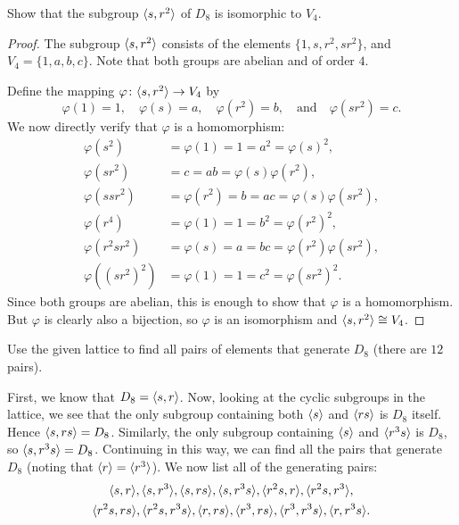  Show that the subgroup $\langle{s, r^2}\rangle$ of $D_8$ is
isomorphic to $V_4$.
\begin{proof}
  The subgroup $\langle{s, r^2}\rangle$ consists of the elements
  $\{1, s, r^2, sr^2\}$, and $V_4 = \{1, a, b, c\}$. Note that both
  groups are abelian and of order $4$.

  Define the mapping $\varphi\colon\langle{s,r^2}\rangle\to V_4$ by
  \begin{equation*}
    \varphi(1) = 1,
    \quad
    \varphi(s) = a,
    \quad
    \varphi(r^2) = b,
    \quad\text{and}\quad
    \varphi(sr^2) = c.
  \end{equation*}
  We now directly verify that $\varphi$ is a homomorphism:
  \begin{align*}
    \varphi(s^2) &= \varphi(1) = 1 = a^2 = \varphi(s)^2, \\
    \varphi(sr^2) &= c = ab = \varphi(s)\varphi(r^2), \\
    \varphi(ssr^2) &= \varphi(r^2) = b = ac = \varphi(s)\varphi(sr^2), \\
    \varphi(r^4) &= \varphi(1) = 1 = b^2 = \varphi(r^2)^2, \\
    \varphi(r^2sr^2) &= \varphi(s) = a = bc = \varphi(r^2)\varphi(sr^2), \\
    \varphi((sr^2)^2) &= \varphi(1) = 1 = c^2 = \varphi(sr^2)^2.
  \end{align*}
  Since both groups are abelian, this is enough to show that $\varphi$
  is a homomorphism. But $\varphi$ is clearly also a bijection, so
  $\varphi$ is an isomorphism and $\langle{s,r^2}\rangle\cong V_4$.
\end{proof}

 Use the given lattice to find all pairs of elements that
generate $D_8$ (there are $12$ pairs).
\begin{solution}
  First, we know that $D_8 = \langle{s,r}\rangle$. Now, looking at the cyclic
  subgroups in the lattice, we see that the only subgroup containing
  both $\langle{s}\rangle$ and $\langle{rs}\rangle$ is $D_8$ itself. Hence
  $\langle{s, rs}\rangle = D_8$. Similarly, the only subgroup containing
  $\langle{s}\rangle$ and $\langle{r^3s}\rangle$ is $D_8$, so $\langle{s, r^3s}\rangle =
  D_8$. Continuing in this way, we can find all the pairs that
  generate $D_8$ (noting that $\langle{r}\rangle = \langle{r^3}\rangle$). We now list all
  of the generating pairs:
  \begin{multline*}
    \langle{s,r}\rangle, \langle{s,r^3}\rangle, \langle{s,rs}\rangle, \langle{s,r^3s}\rangle,
    \langle{r^2s,r}\rangle, \langle{r^2s,r^3}\rangle, \\ \langle{r^2s,rs}\rangle, \langle{r^2s,r^3s}\rangle,
    \langle{r,rs}\rangle, \langle{r^3,rs}\rangle, \langle{r^3,r^3s}\rangle, \langle{r,r^3s}\rangle.
    \qedhere
  \end{multline*}
\end{solution}

